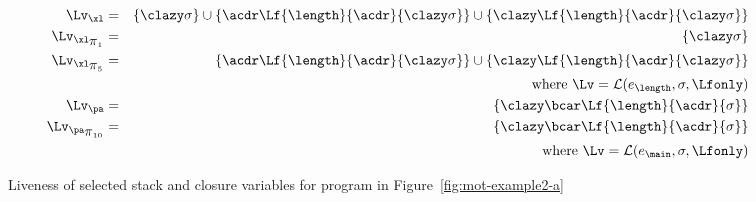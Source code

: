 \begin{figure}[t!]
\renewcommand{\arraystretch}{1}
\begin{minipage}{.51\textwidth}
  \small
  \begin{eqnarray*}
    \Lv_{\xl} &=& \{\clazy\sigma\} \cup \{\acdr\Lf{\length}{\acdr}{\clazy\sigma}\} \cup \{\clazy\Lf{\length}{\acdr}{\clazy\sigma}\}\\
    \Lv_{\xl_{\mbox{$\pi$}_1}} &=& \{\clazy\sigma\} \\
    \Lv_{\xl_{\mbox{$\pi$}_5}} &=&  \{\acdr\Lf{\length}{\acdr}{\clazy\sigma}\} \cup \{\clazy\Lf{\length}{\acdr}{\clazy\sigma}\} \\
    &&     \mbox{where } \Lv = \mathcal{L}(e_{\length},\sigma,\Lfonly) \\
    \Lv_{\pa} &=& \{\clazy\bcar\Lf{\length}{\acdr}{\sigma}\}\\
    \Lv_{{\pa}_{\mbox{$\pi$}_{10}}} &=&  \{\clazy\bcar\Lf{\length}{\acdr}{\sigma}\}\\
    &&       \mbox{where }  \Lv =  \mathcal{L}(e_{\main},\sigma,\Lfonly) 
  \end{eqnarray*}
\end{minipage} 
\caption{Liveness of selected stack and closure variables for program
  in Figure~\ref{fig:mot-example2-a}}\label{fig:mot-example2-b}
\end{figure}


